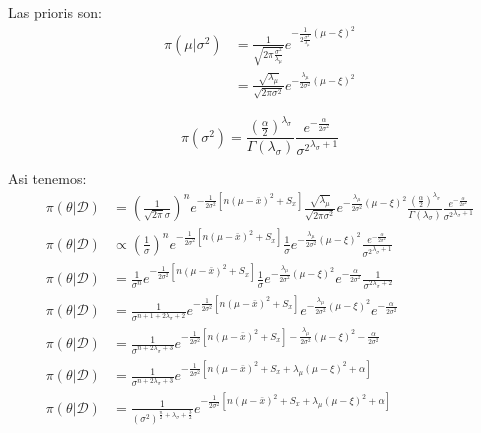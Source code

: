 \documentclass[12pt,]{article}
\begin{document}
Las prioris son: \[
\begin{array}{rl}
\pi(\mu| \sigma^2) & = \frac{1}{\sqrt{2\pi\frac{\sigma^2}{\lambda_\mu}}}e^{-\frac{1}{2\frac{\sigma^2}{\lambda_\mu}}(\mu-\xi)^2}\\
& =\frac{\sqrt{\lambda_\mu}}{\sqrt{2\pi \sigma^2}}e^{-\frac{\lambda_\mu}{2\sigma^2}(\mu-\xi)^2}
\end{array}
\]

\[\pi(\sigma^2)=\frac{\left(\frac{\alpha}{2}\right)^{\lambda_\sigma}}{\Gamma(\lambda_\sigma)}\frac{e^{-\frac{\alpha}{2\sigma^2}}}{{\sigma^2}^{\lambda_\sigma+1}}\]

Asi tenemos: \[
\begin{array}{rl}
\pi(\theta|\mathcal{D}) & =  \left( \frac{1}{\sqrt{2\pi}\sigma}\right)^ne^{-\frac{1}{2\sigma^2}[n(\mu-\bar x)^2 + S_x]}\frac{\sqrt{\lambda_\mu}}{\sqrt{2\pi \sigma^2}}e^{-\frac{\lambda_\mu}{2\sigma^2}(\mu-\xi)^2}\frac{\left(\frac{\alpha}{2}\right)^{\lambda_\sigma}}{\Gamma(\lambda_\sigma)}\frac{e^{-\frac{\alpha}{2\sigma^2}}}{{\sigma^2}^{\lambda_\sigma+1}}\\
\pi(\theta|\mathcal{D}) & \propto \left( \frac{1}{\sigma}\right)^ne^{-\frac{1}{2\sigma^2}[n(\mu-\bar x)^2 + S_x]}\frac{1}{\sigma}e^{-\frac{\lambda_\mu}{2\sigma^2}(\mu-\xi)^2}\frac{e^{-\frac{\alpha}{2\sigma^2}}}{{\sigma^2}^{\lambda_\sigma+1}}\\
\pi(\theta|\mathcal{D}) & = \frac{1}{\sigma^n} e^{-\frac{1}{2\sigma^2}[n(\mu-\bar x)^2 + S_x]}\frac{1}{\sigma}e^{-\frac{\lambda_\mu}{2\sigma^2}(\mu-\xi)^2}e^{-\frac{\alpha}{2\sigma^2}}\frac{1}{{\sigma}^{2\lambda_\sigma+2}}\\
\pi(\theta|\mathcal{D}) & = \frac{1}{\sigma^{n+1+2\lambda_\sigma+2}} e^{-\frac{1}{2\sigma^2}[n(\mu-\bar x)^2 + S_x]}e^{-\frac{\lambda_\mu}{2\sigma^2}(\mu-\xi)^2}e^{-\frac{\alpha}{2\sigma^2}}\\
\pi(\theta|\mathcal{D}) & = \frac{1}{\sigma^{n+2\lambda_\sigma+3}} e^{-\frac{1}{2\sigma^2}[n(\mu-\bar x)^2 + S_x]-\frac{\lambda_\mu}{2\sigma^2}(\mu-\xi)^2-\frac{\alpha}{2\sigma^2}}\\
\pi(\theta|\mathcal{D}) & = \frac{1}{\sigma^{n+2\lambda_\sigma+3}} e^{-\frac{1}{2\sigma^2}[n(\mu-\bar x)^2 + S_x+\lambda_\mu(\mu-\xi)^2+\alpha]}\\
\pi(\theta|\mathcal{D}) & = \frac{1}{(\sigma^2)^{\frac{n}{2}+\lambda_\sigma+\frac{3}{2}}} e^{-\frac{1}{2\sigma^2}[n(\mu-\bar x)^2 + S_x+\lambda_\mu(\mu-\xi)^2+\alpha]}\\
\end{array}
\]
\end{document}
